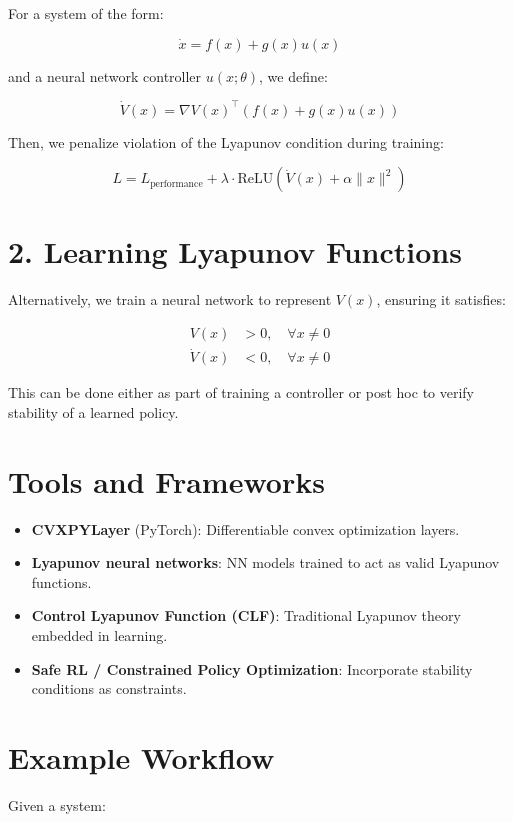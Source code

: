 \documentclass{article}
\begin{document}
For a system of the form:

\[
\dot{x} = f(x) + g(x) u(x)
\]

and a neural network controller \( u(x; \theta) \), we define:

\[
\dot{V}(x) = \nabla V(x)^\top (f(x) + g(x) u(x))
\]

Then, we penalize violation of the Lyapunov condition during training:

\[
L = L_{\text{performance}} + \lambda \cdot \text{ReLU}\left( \dot{V}(x) + \alpha \|x\|^2 \right)
\]

\section*{2. Learning Lyapunov Functions}

Alternatively, we train a neural network to represent \( V(x) \), ensuring it satisfies:

\begin{align*}
V(x) &> 0, \quad \forall x \neq 0 \\
\dot{V}(x) &< 0, \quad \forall x \neq 0
\end{align*}

This can be done either as part of training a controller or post hoc to verify stability of a learned policy.

\section*{Tools and Frameworks}

\begin{itemize}
  \item \textbf{CVXPYLayer} (PyTorch): Differentiable convex optimization layers.
  \item \textbf{Lyapunov neural networks}: NN models trained to act as valid Lyapunov functions.
  \item \textbf{Control Lyapunov Function (CLF)}: Traditional Lyapunov theory embedded in learning.
  \item \textbf{Safe RL / Constrained Policy Optimization}: Incorporate stability conditions as constraints.
\end{itemize}

\section*{Example Workflow}

Given a system:
\end{document}
